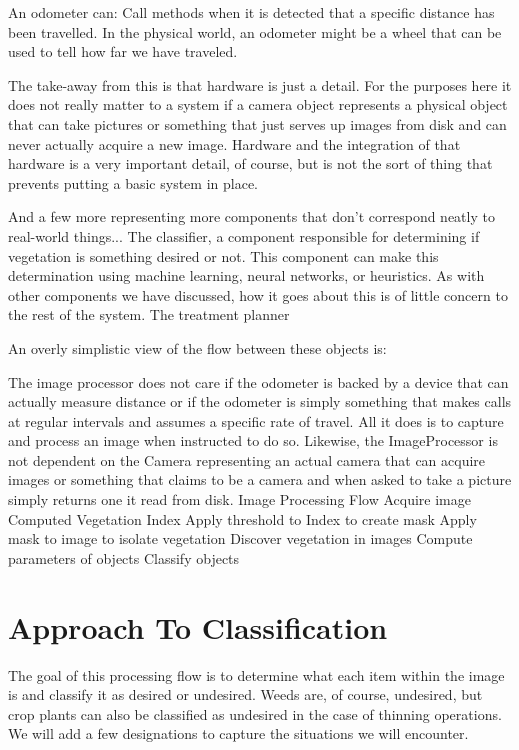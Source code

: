 \documentclass[letterpaper]{article}
\begin{document}
An odometer can:
Call methods when it is detected that a specific distance has been travelled. In the physical world, an odometer might be a wheel that can be used to tell how far we have traveled.

The take-away from this is that hardware is just a detail.  For the purposes here it does not really matter to a system if a camera object represents a physical object that can take pictures or something that just serves up images from disk and can never actually acquire a new image. Hardware and the integration of that hardware is a very important detail, of course, but is not the sort of thing that prevents putting a basic system in place.


And a few more representing more components that don’t correspond neatly to real-world things...
The classifier, a component responsible for determining if vegetation is something desired or not. This component can make this determination using machine learning, neural networks, or heuristics. As with other components we have discussed, how it goes about this is of little concern to the rest of the system.
The treatment planner

An overly simplistic view of the flow between these objects is:



The image processor does not care if the odometer is backed by a device that can actually measure distance or if the odometer is simply something that makes calls at regular intervals and assumes a specific rate of travel.  All it does is to capture and process an image when instructed to do so. Likewise, the ImageProcessor is not dependent on the Camera representing an actual camera that can acquire images or something that claims to be a camera and when asked to take a picture simply returns one it read from disk.
Image Processing Flow
Acquire image
Computed Vegetation Index
Apply threshold to Index to create mask
Apply mask to image to isolate vegetation
Discover vegetation in images
Compute parameters of objects
Classify objects
\section{Approach To Classification}
The goal of this processing flow is to determine what each item within the image is and classify it as desired or undesired. Weeds are, of course, undesired, but crop plants can also be classified as undesired in the case of thinning operations. We will add a few designations to capture the situations we will encounter.
\begin{itemize}
	\item{Desired, the crop}
	\item{Undesired, either crop that must be thinned or weeds that can be treated without crop damage}
	\item{Unknown, vegetation that cannot be confidently identified}
	\item{Ignored, vegetation that is too close to desired vegetation to be treated without crop damage|
\end{itemize}
\end{document}
